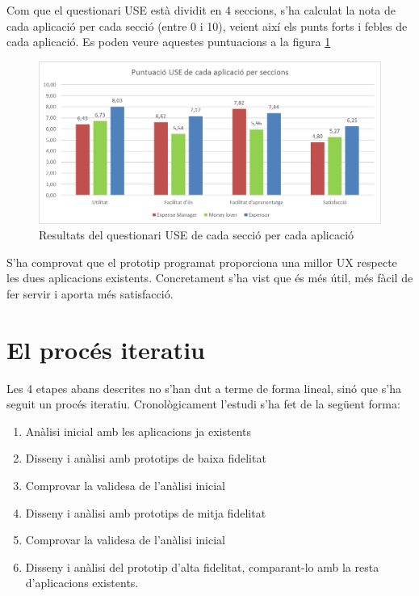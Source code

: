 Com que el questionari USE està dividit en 4 seccions, s'ha calculat la nota de cada aplicació per cada secció (entre 0 i 10), veient així els punts forts i febles de cada aplicació. Es poden veure aquestes puntuacions a la figura \ref{fig:USE_3}

\begin{figure}[htp]
\centering
\includegraphics[scale=0.7]{USE_3.png}
\caption{Resultats del questionari USE de cada secció per cada aplicació}\label{fig:USE_3}
\end{figure}

S'ha comprovat que el prototip programat proporciona una millor \ac{UX} respecte les dues aplicacions existents. Concretament s'ha vist que és més útil, més fàcil de fer servir i aporta més satisfacció. 

\section{El procés iteratiu}
Les 4 etapes abans descrites no s'han dut a terme de forma lineal, sinó que s'ha seguit un procés iteratiu. Cronològicament l'estudi s'ha fet de la següent forma:

\begin{enumerate}
\item Anàlisi inicial amb les aplicacions ja existents
\item Disseny i anàlisi amb prototips de baixa fidelitat
\item Comprovar la validesa de l'anàlisi inicial
\item Disseny i anàlisi amb prototips de mitja fidelitat
\item Comprovar la validesa de l'anàlisi inicial
\item Disseny i anàlisi del prototip d'alta fidelitat, comparant-lo amb la resta d'aplicacions existents.
\end{enumerate}

